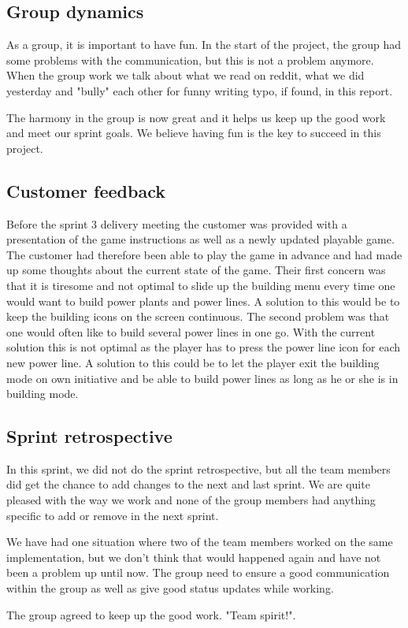 \subsection{Group dynamics}
	As a group, it is important to have fun. In the start of the project, the group had some
	problems with the communication, but this is not a problem anymore.
	When the group work we talk about what we read on reddit, what we did yesterday and 
	"bully" each other for funny writing typo, if found, in this report. 

	The harmony in the group is now great and it helps us keep up the good work and meet 
	our sprint goals. We believe having fun is the key to succeed in this project. 

\subsection{Customer feedback}

	Before the sprint 3 delivery meeting the customer was provided with a presentation 
	of the game instructions as well as a newly updated playable game. The customer had 
	therefore been able to play the game in advance and had made up some thoughts about 
	the current state of the game. Their first concern was that it is tiresome and not 
	optimal to slide up the building menu every time one would want to build power plants 
	and power lines. A solution to this would be to keep the building icons on the screen 
	continuous. The second problem was that one would often like to build several power 
	lines in one go. With the current solution this is not optimal as the player has to 
	press the power line icon for each new power line. A solution to this could be to let 
	the player exit the building mode on own initiative and be able to build power lines as 
	long as he or she is in building mode.

\subsection{Sprint retrospective}
	In this sprint, we did not do the sprint retrospective, but all the team members did
	get the chance to add changes to the next and last sprint. We are quite pleased with the way 
	we work and none of the group members had anything specific to add or remove in the next sprint.

	We have had one situation where two of the team members worked on the same implementation, 
	but we don't think that would happened again and have not been a problem up until now. 
	The group need to ensure a good communication within the group as well as give good status
	updates while working. 

	The group agreed to keep up the good work. "Team spirit!".
